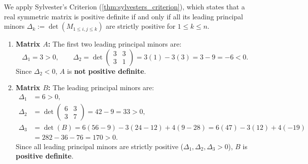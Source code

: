 \begin{exercisesolution*}
\label{sol:sylvester_criterion_matrix_tests}
We apply Sylvester's Criterion (\cref{thm:sylvesters_criterion}), which states that a real symmetric matrix is positive definite if and only if all its leading principal minors $\Delta_k := \det(M_{1 \le i,j \le k})$ are strictly positive for $1 \le k \le n$.
\begin{enumerate}[label=\textbf{(\alph*)}]
    \item \textbf{Matrix $A$:}
    The first two leading principal minors are:
    \[
    \Delta_1 = 3 > 0, \qquad \Delta_2 = \det \begin{pmatrix} 3 & 3 \\ 3 & 1 \end{pmatrix} = 3(1) - 3(3) = 3 - 9 = -6 < 0.
    \]
    Since $\Delta_2 < 0$, $A$ is \textbf{not positive definite}.

    \item \textbf{Matrix $B$:}
    The leading principal minors are:
    \begin{align*}
    \Delta_1 &= 6 > 0, \\
    \Delta_2 &= \det \begin{pmatrix} 6 & 3 \\ 3 & 7 \end{pmatrix} = 42 - 9 = 33 > 0, \\
    \Delta_3 &= \det(B) = 6(56 - 9) - 3(24 - 12) + 4(9 - 28) = 6(47) - 3(12) + 4(-19) \\
    &= 282 - 36 - 76 = 170 > 0.
    \end{align*}
    Since all leading principal minors are strictly positive ($\Delta_1, \Delta_2, \Delta_3 > 0$), $B$ is \textbf{positive definite}.


\end{enumerate}
\end{exercisesolution*}
